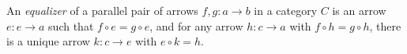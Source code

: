 An \emph{equalizer} of a parallel pair of arrows $f, g: a \to b$ in a category $C$ is an arrow $e: e \to a$ such that $f \circ e = g \circ e$, and for any arrow $h: c \to a$ with $f \circ h = g \circ h$, there is a unique arrow $k: c \to e$ with $e \circ k = h$.
